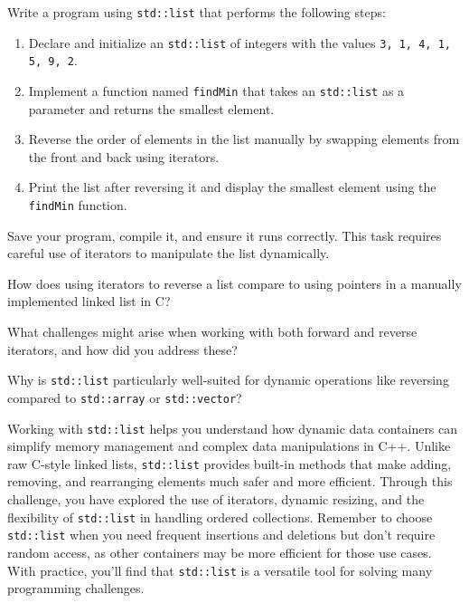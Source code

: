 \begin{challenge}
    \begin{task}
        Write a program using \texttt{std::list} that performs the following steps:
        \begin{enumerate}
            \item Declare and initialize an \texttt{std::list} of integers with the values \texttt{3, 1, 4, 1, 5, 9, 2}.
            \item Implement a function named \texttt{findMin} that takes an \texttt{std::list} as a parameter and returns the smallest element.
            \item Reverse the order of elements in the list manually by swapping elements from the front and back using iterators.
            \item Print the list after reversing it and display the smallest element using the \texttt{findMin} function.
        \end{enumerate}

        Save your program, compile it, and ensure it runs correctly. This task requires careful use of iterators to manipulate the list dynamically.

        \begin{questions}
            \item How does using iterators to reverse a list compare to using pointers in a manually implemented linked list in C?
            \item What challenges might arise when working with both forward and reverse iterators, and how did you address these?
            \item Why is \texttt{std::list} particularly well-suited for dynamic operations like reversing compared to \texttt{std::array} or \texttt{std::vector}?
        \end{questions}
    \end{task}

    \begin{advise}
        Working with \texttt{std::list} helps you understand how dynamic data containers can simplify memory management and complex data manipulations in C++. 
        Unlike raw C-style linked lists, \texttt{std::list} provides built-in methods that make adding, removing, and rearranging elements much safer and more efficient. 
        Through this challenge, you have explored the use of iterators, dynamic resizing, and the flexibility of \texttt{std::list} in handling ordered collections. 
        Remember to choose \texttt{std::list} when you need frequent insertions and deletions but don't require random access, as other containers may be more efficient for those use cases. 
        With practice, you'll find that \texttt{std::list} is a versatile tool for solving many programming challenges.
    \end{advise}
\end{challenge}
